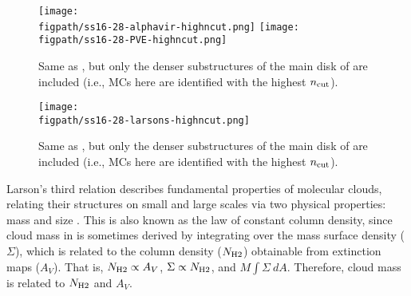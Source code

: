 \IfFileExists{emulateapjlegacy.cls}{\documentclass[iop]{emulateapjlegacy}}{\documentclass[iop]{emulateapj}}
\begin{document}
\begin{figure*}[htbp]
\centering
\texttt{[image: \\figpath/ss16-28-alphavir-highncut.png]}
\texttt{[image: \\figpath/ss16-28-PVE-highncut.png]}
\caption{
Same as , but only the denser substructures of the main disk of \flower are included
(i.e., MCs here are identified with the highest $n_{\rm cut}$).
\label{fig:alpha16-28-highncut}}
\end{figure*}

\begin{figure*}[htbp]
\centering
\texttt{[image: \\figpath/ss16-28-larsons-highncut.png]}
\caption{
Same as , but only the denser substructures of the main disk of \flower are included
(i.e., MCs here are identified with the highest $n_{\rm cut}$).
\label{fig:larsons16-28-highncut}}
\end{figure*}

Larson's third relation describes fundamental properties of molecular clouds, relating their structures on small and large scales 
via two physical properties: mass and size \citep{Larson81a, Mckee07a}. This is also known as the law of constant column density, 
since cloud mass in \obs is sometimes derived by integrating
over the mass surface density ($\Sigma$), which is related to the column density ($N_{\rm H2}$) obtainable from extinction maps ($A_V$).   
That is, $N_{\rm H2}\propto A_V$, $\Sigma\propto N_{\rm H2}$, and $M$\eq$\int \Sigma~dA$.
Therefore, cloud mass is related to $N_{\rm H2}$ and $A_V$.
\end{document}
